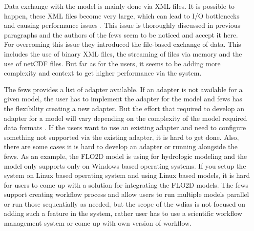 Data exchange with the model is mainly done via XML files. It is possible to happen, these XML files become very large, which can lead to I/O bottlenecks and causing performance issues \cite{Werner2013TheSystem}. This issue is thoroughly discussed in previous paragraphs and the authors of the \acrshort{fews} \cite{Werner2013TheSystem} seem to be noticed and accept it here. For overcoming this issue they introduced the file-based exchange of data. This includes the use of binary XML files, the streaming of files via memory and the use of \acrshort{netCDF} files. But far as for the users, it seems to be adding more complexity and context to get higher performance via the system.

The \acrshort{fews} provides a list of adapter available. If an adapter is not available for a given model, the user has to implement the adapter for the model and \acrshort{fews} has the flexibility creating a new adapter. But the effort that required to develop an adapter for a model will vary depending on the complexity of the model required data formats \cite{Werner2013TheSystem}. If the users want to use an existing adapter and need to configure something not supported via the existing adapter, it is hard to get done. Also, there are some cases it is hard to develop an adapter or running alongside the \acrshort{fews}. As an example, the FLO2D model is using for hydrologic modeling and the model only supports only on Windows based operating systems. If you setup the system on Linux based operating system and using Linux based models, it is hard for users to come up with a solution for integrating the FLO2D models.
The \acrshort{fews} support creating workflow process and allow users to run multiple models parallel or run those sequentially as needed, but the scope of the \acrshort{wdias} is not focused on adding such a feature in the system, rather user has to use a scientific workflow management system or come up with own version of workflow.
